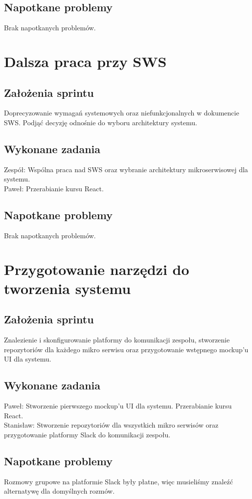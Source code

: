 \documentclass[a4paper,11pt]{report}
\begin{document}
\subsection {Napotkane problemy}
Brak napotkanych problemów.

\section {Dalsza praca przy SWS}
\subsection {Założenia sprintu}
Doprecyzowanie wymagań systemowych oraz niefunkcjonalnych w dokumencie SWS. Podjąć decyzję odnośnie do wyboru architektury systemu.
\subsection {Wykonane zadania}
Zespół: Wspólna praca nad SWS oraz wybranie architektury mikroserwisowej dla systemu.\\
Paweł: Przerabianie kursu React.\\
\subsection {Napotkane problemy}
Brak napotkanych problemów.

\section {Przygotowanie narzędzi do tworzenia systemu}
\subsection {Założenia sprintu}
Znalezienie i skonfigurowanie platformy do komunikacji zespołu, stworzenie repozytoriów dla każdego mikro serwisu oraz przygotowanie wstępnego mockup'u UI dla systemu.
\subsection {Wykonane zadania}
Paweł: Stworzenie pierwszego mockup'u UI dla systemu. Przerabianie kursu React. \\
Stanisław: Stworzenie repozytoriów dla wszystkich mikro serwisów oraz przygotowanie platformy Slack do komunikacji zespołu.\\
\subsection {Napotkane problemy}
Rozmowy grupowe na platformie Slack były płatne, więc musieliśmy znaleźć alternatywę dla domyślnych rozmów.
\end{document}
